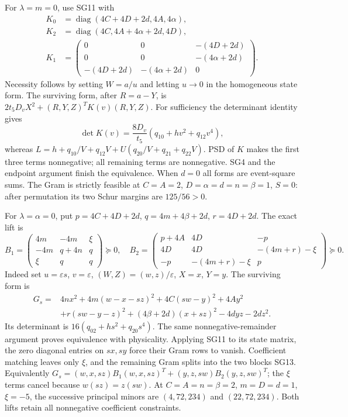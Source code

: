 For $\lambda=m=0$, use SG11 with
\[
\begin{split}
 K_0&=\operatorname{diag}(4C+4D+2d,4A,4\alpha),\\
 K_2&=\operatorname{diag}(4C,4A+4\alpha+2d,4D),\\
 K_1&=\begin{pmatrix}0&0&-(4D+2d)\\
                    0&0&-(4\alpha+2d)\\
                    -(4D+2d)&-(4\alpha+2d)&0\end{pmatrix}.
\end{split}                                                     \tag{SG12}
\]
Necessity follows by setting $W=a/u$ and letting $u\to0$ in the
homogeneous state form.  The surviving form, after $R=a-Y$, is
$2t_5D_vX^2+(R,Y,Z)^TK(v)(R,Y,Z)$.
For sufficiency the determinant identity gives
\[
 \det K(v)=\frac{8D_v}{t_5}(q_{10}+hv^2+q_{12}v^4),
\]
whereas
$L=h+q_{10}/V+q_{12}V+U(q_{20}/V+q_{21}+q_{22}V)$.
PSD of $K$ makes the first three terms nonnegative; all remaining
terms are nonnegative.  SG4 and the endpoint argument finish the
equivalence.  When $d=0$ all forms are event-square sums.
The Gram is strictly feasible at
$C=A=2$, $D=\alpha=d=n=\beta=1$, $S=0$:
after permutation its two Schur margins are $125/56>0$.

For $\lambda=\alpha=0$, put $p=4C+4D+2d$,
$q=4m+4\beta+2d$, $r=4D+2d$.  The exact lift is
\[
 B_1=\begin{pmatrix}4m&-4m&\xi\\-4m&q+4n&q\\\xi&q&q\end{pmatrix}
 \succeq0,\quad
 B_2=\begin{pmatrix}p+4A&4D&-p\\
                 4D&4D&-(4m+r)-\xi\\
                 -p&-(4m+r)-\xi&p\end{pmatrix}\succeq0.          \tag{SG13}
\]
Indeed set $u=\varepsilon s$, $v=\varepsilon$,
$(W,Z)=(w,z)/\varepsilon$, $X=x$, $Y=y$.
The surviving form is
\[
\begin{split}
 G_s={}&4nx^2+4m(w-x-sz)^2+4C(sw-y)^2+4Ay^2\\
       &+r(sw-y-z)^2+(4\beta+2d)(x+sz)^2-4dyz-2dz^2.
\end{split}
\]
Its determinant is $16(q_{02}+hs^2+q_{20}s^4)$.  The same
nonnegative-remainder argument proves equivalence with physicality.
Applying SG11 to its state matrix, the zero diagonal entries on
$sx,sy$ force their Gram rows to vanish.  Coefficient matching leaves
only $\xi$, and the remaining Gram splits into the two blocks SG13.
Equivalently
$G_s=(w,x,sz)B_1(w,x,sz)^T+(y,z,sw)B_2(y,z,sw)^T$;
the $\xi$ terms cancel because $w(sz)=z(sw)$.
At $C=A=n=\beta=2$, $m=D=d=1$, $\xi=-5$, the successive
principal minors are $(4,72,234)$ and $(22,72,234)$.
Both lifts retain all nonnegative coefficient constraints.

